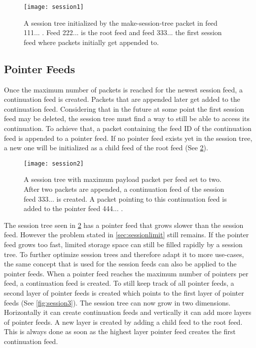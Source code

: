 \begin{figure}
\centering
\texttt{[image: session1]}
\caption{A session tree initialized by the make-session-tree packet in feed 111... . Feed 222... is the root feed and feed 333... the first session feed where packets initially get appended to.}
\label{fig:session1}
\end{figure}

\subsection{Pointer Feeds}
Once the maximum number of packets is reached for the newest session feed, a continuation feed is created. Packets that are appended later get added to the continuation feed. Considering that in the future at some point the first session feed may be deleted, the session tree must find a way to still be able to access its continuation. To achieve that, a packet containing the feed ID of the continuation feed is appended to a pointer feed. If no pointer feed exists yet in the session tree, a new one will be initialized as a child feed of the root feed (See \cref{fig:session2}).

\begin{figure}
\centering
\texttt{[image: session2]}
\caption{A session tree with maximum payload packet per feed set to two. After two packets are appended, a continuation feed of the session feed 333... is created. A packet pointing to this continuation feed is added to the pointer feed 444... .}
\label{fig:session2}
\end{figure}

The session tree seen in \cref{fig:session2} has a pointer feed that grows slower than the session feed. However the problem stated in \cref{sec:sessionlimit} still remains. If the pointer feed grows too fast, limited storage space can still be filled rapidly by a session tree. To further optimize session trees and therefore adapt it to more use-cases, the same concept that is used for the session feeds can also be applied to the pointer feeds. When a pointer feed reaches the maximum number of pointers per feed, a continuation feed is created. To still keep track of all pointer feeds, a second layer of pointer feeds is created which points to the first layer of pointer feeds (See \cref{fig:session3}). The session tree can now grow in two dimensions. Horizontally it can create continuation feeds and vertically it can add more layers of pointer feeds. A new layer is created by adding a child feed to the root feed. This is always done as soon as the highest layer pointer feed creates the first continuation feed. 

